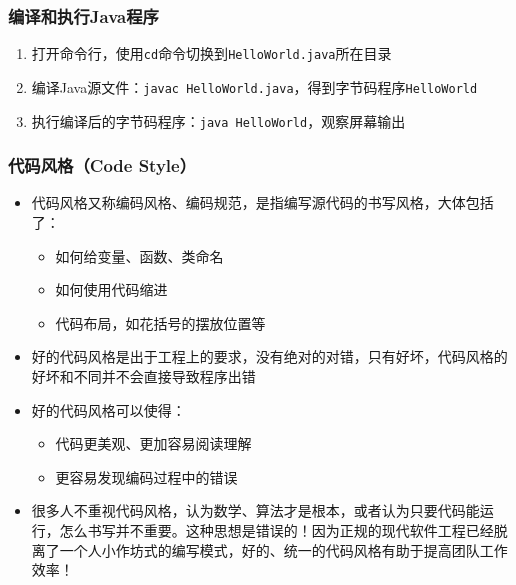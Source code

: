 \begin{frame}
  \frametitle{编译和执行Java程序}
  \begin{enumerate}
    \item 打开命令行，使用\texttt{cd}命令切换到\texttt{HelloWorld.java}所在目录
    \item 编译Java源文件：\texttt{javac HelloWorld.java}，得到字节码程序\texttt{HelloWorld}
    \item 执行编译后的字节码程序：\texttt{java HelloWorld}，观察屏幕输出
  \end{enumerate}
\end{frame}

\begin{frame}
  \frametitle{代码风格（Code Style）}
  \begin{itemize}
    \item 代码风格又称编码风格、编码规范，是指编写源代码的书写风格，大体包括了：
      \begin{itemize}
        \item 如何给变量、函数、类命名
        \item 如何使用代码缩进
        \item 代码布局，如花括号的摆放位置等
      \end{itemize}
    \item 好的代码风格是出于工程上的要求，没有绝对的对错，只有好坏，代码风格的好坏和不同并不会直接导致程序出错
    \item 好的代码风格可以使得：
      \begin{itemize}
        \item 代码更美观、更加容易阅读理解
        \item 更容易发现编码过程中的错误
      \end{itemize}
    \item 很多人不重视代码风格，认为数学、算法才是根本，或者认为只要代码能运行，怎么书写并不重要。这种思想是错误的！因为正规的现代软件工程已经脱离了一个人小作坊式的编写模式，好的、统一的代码风格有助于提高团队工作效率！
  \end{itemize}
\end{frame}

